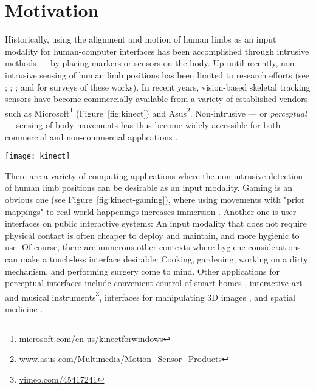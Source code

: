 \section{Motivation}
\label{sec:motivation}

Historically, using the alignment and motion of human limbs as an input modality for human-computer interfaces has been accomplished through intrusive methods --- by placing markers or sensors on the body. Up until recently, non-intrusive sensing of human limb positions has been limited to research efforts (see \textcite{Moeslund:2006}; \textcite{Porta:2002}; \textcite{Moeslund:2001}; and \textcite{Gavrila:1999} for surveys of these works). In recent years, vision-based skeletal tracking sensors have become commercially available from a variety of established vendors such as Microsoft\footnote{\href{http://www.microsoft.com/en-us/kinectforwindows/}{microsoft.com/en-us/kinectforwindows}} (Figure~\ref{fig:kinect}) and Asus\footnote{\href{http://www.asus.com/Multimedia/Motion_Sensor_Products/}{www.asus.com/Multimedia/Motion\_Sensor\_Products}}. Non-intrusive --- or \emph{perceptual} \parencite{Turk:2000, Crowley:2000} --- sensing of body movements has thus become widely accessible for both commercial and non-commercial applications \parencite{Francese:2012}.

\begin{SCfigure}[3][h]
\centering
\texttt{[image: kinect]}
\caption{The Microsoft Kinect sensor is equipped with a depth camera that can "see" the positions and motion of human limbs.}
\label{fig:kinect}
\end{SCfigure}

There are a variety of computing applications where the non-intrusive detection of human limb positions can be desirable as an input modality. Gaming is an obvious one (see Figure~\ref{fig:kinect-gaming}), where using movements with "prior mappings" to real-world happenings increases immersion \parencite{Cairns:2014}. Another one is user interfaces on public interactive systems: An input modality that does not require physical contact is often cheaper to deploy and maintain, and more hygienic to use. Of course, there are numerous other contexts where hygiene considerations can make a touch-less interface desirable: Cooking, gardening, working on a dirty mechanism, and performing surgery \parencite{Wen:2013} come to mind. Other applications for perceptual interfaces include convenient control of smart homes \parencite{Tang:2013}, interactive art and musical instruments\footnote{\href{http://vimeo.com/45417241}{vimeo.com/45417241}}, interfaces for manipulating 3D images \parencite{Gallo:2013}, and spatial medicine \parencite{Lozano-Quilis:2013, Huang:2011, Simmons:2013}.

